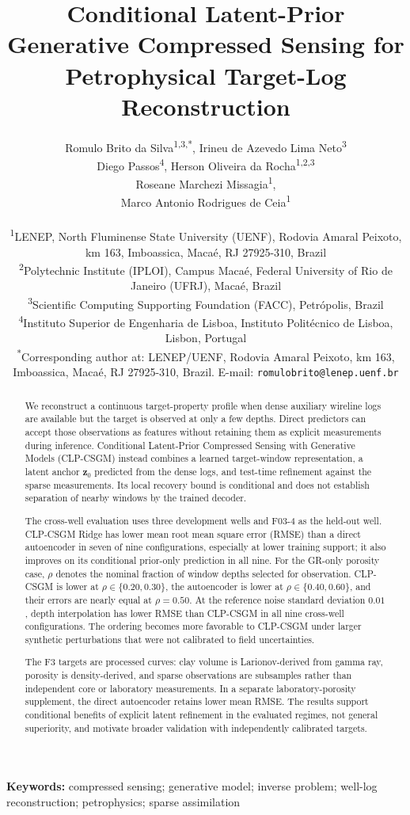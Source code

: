 \documentclass[11pt]{article}
\title{Conditional Latent-Prior Generative Compressed Sensing for Petrophysical Target-Log Reconstruction}
\author{%
Romulo Brito da Silva\textsuperscript{1,3,*},
Irineu de Azevedo Lima Neto\textsuperscript{3}\\
Diego Passos\textsuperscript{4},
Herson Oliveira da Rocha\textsuperscript{1,2,3}\\
Roseane Marchezi Missagia\textsuperscript{1},\\
Marco Antonio Rodrigues de Ceia\textsuperscript{1}\\[0.5em]
\parbox{0.95\textwidth}{\centering\small
\textsuperscript{1}LENEP, North Fluminense State University (UENF),
Rodovia Amaral Peixoto, km 163, Imboassica,
Macaé, RJ 27925-310, Brazil\\
\textsuperscript{2}Polytechnic Institute (IPLOI), Campus Macaé,
Federal University of Rio de Janeiro (UFRJ), Macaé, Brazil\\
\textsuperscript{3}Scientific Computing Supporting Foundation (FACC),
Petrópolis, Brazil\\
\textsuperscript{4}Instituto Superior de Engenharia de Lisboa,
Instituto Politécnico de Lisboa, Lisbon, Portugal\\[0.35em]
\textsuperscript{*}Corresponding author at:
LENEP/UENF, Rodovia Amaral Peixoto, km 163, Imboassica,
Macaé, RJ 27925-310, Brazil.
E-mail: \texttt{romulobrito@lenep.uenf.br}}
}
\date{}
\theoremstyle{remark}
\newcommand{\keywords}[1]{%
  \vspace{0.5em}
  \noindent\textbf{Keywords:} #1\par
}
\begin{document}
\doublespacing
\linenumbers
\maketitle

\begin{abstract}
We reconstruct a continuous target-property profile when dense auxiliary
wireline logs are available but the target is observed at only a few depths.
Direct predictors can accept those observations as features without retaining
them as explicit measurements during inference. Conditional Latent-Prior
Compressed Sensing with Generative Models (CLP-CSGM) instead combines a
learned target-window representation, a latent anchor
$\boldsymbol{z}_0$ predicted from
the dense logs, and test-time refinement against the sparse measurements.
Its local recovery bound is conditional and does not establish separation of
nearby windows by the trained decoder.

The cross-well evaluation uses three development wells and F03-4 as the
held-out well. CLP-CSGM Ridge has lower mean root
mean square error (RMSE) than a direct autoencoder in seven of nine
configurations, especially at lower training support; it also improves on its
conditional prior-only prediction in all
nine. For the GR-only porosity case, $\rho$ denotes the nominal fraction of
window depths selected for observation. CLP-CSGM is lower at
$\rho\in\{0.20,0.30\}$, the autoencoder is lower at
$\rho\in\{0.40,0.60\}$, and their errors are nearly equal at $\rho=0.50$.
At the reference noise standard deviation $0.01$, depth interpolation has
lower RMSE than CLP-CSGM in all nine cross-well configurations. The ordering
becomes more favorable to CLP-CSGM under larger synthetic perturbations that
were not calibrated to field uncertainties.

The F3 targets are processed curves: clay volume is Larionov-derived from
gamma ray, porosity is density-derived, and sparse observations are
subsamples rather than independent core or laboratory measurements. In a
separate laboratory-porosity supplement, the direct autoencoder retains lower
mean RMSE. The results support conditional benefits of explicit latent
refinement in the evaluated regimes, not general superiority, and motivate
broader validation with independently calibrated targets.
\end{abstract}

\keywords{compressed sensing; generative model; inverse problem;
well-log reconstruction; petrophysics; sparse assimilation}
\end{document}
